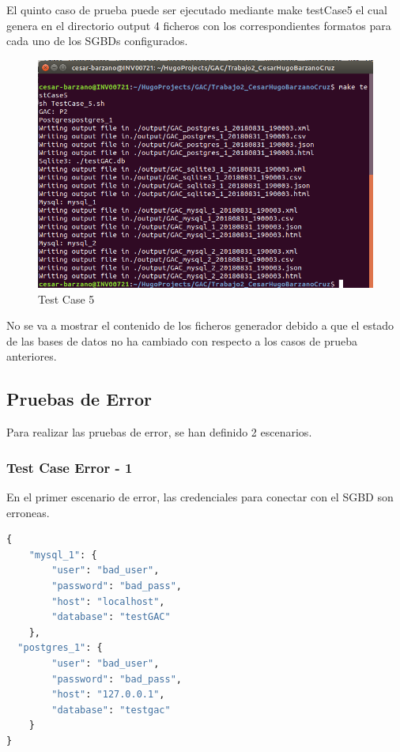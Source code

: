 \documentclass[a4paper,11pt]{book}
\begin{document}
El quinto caso de prueba puede ser ejecutado mediante  make testCase5 el cual genera en el directorio output 4 ficheros con los correspondientes formatos para cada uno de los SGBDs configurados. 

\begin{figure}[H]  
\centering 
\includegraphics[scale=0.35]{imagenes/TestCase5_1.png}
\caption{ Test Case 5 }  
\end{figure}

No se va a mostrar el contenido de los ficheros generador debido a que el estado de las bases de datos no ha cambiado con respecto a los casos de prueba anteriores. 

 
 


 
\subsection{Pruebas de Error} 

Para realizar las pruebas de error, se han definido 2 escenarios.

\subsubsection{Test Case Error - 1}

En el primer escenario de error, las credenciales para conectar con el SGBD son erroneas. 

\begin{lstlisting}[language=python,caption={GAC\_GENERATOR\_CONFIG\_error.json }]
{
	"mysql_1": {
		"user": "bad_user",
		"password": "bad_pass",
		"host": "localhost",
		"database": "testGAC"
	},
  "postgres_1": {
		"user": "bad_user",
		"password": "bad_pass",
		"host": "127.0.0.1",
		"database": "testgac"
	}
}
\end{lstlisting}
\end{document}
